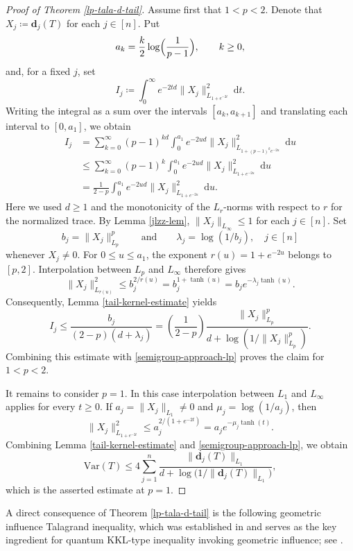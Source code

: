 \documentclass{amsbook}
\theoremstyle{definition}
\theoremstyle{remark}
\numberwithin{section}{chapter}
\numberwithin{equation}{chapter}
\newcommand{\1}{\mathbf{1}}
\newcommand{\dc}{\mathbf{d}}
\begin{document}
\begin{proof}[Proof of Theorem \ref{lp-tala-d-tail}]
 Assume first that $1<p<2$. Denote that $X_{j}\coloneqq \dc_{j}(T)$ for each $j\in [n]$. Put
\[
a_k=\frac{k}{2}\log\Bigl(\frac{1}{p-1}\Bigr),
\qquad k\geq0,
\]
and, for a fixed $j$, set
\[
I_{j}\coloneqq\int_0^\infty e^{-2td}\|X_j\|_{L_{1+e^{-2t}}}^2~\mathrm{d}t.
\]
Writing the integral as a sum over the intervals $[a_k,a_{k+1}]$ and
translating each interval to $[0,a_1]$, we obtain
\begin{align*}
I_{j}&=\sum_{k=0}^\infty (p-1)^{kd}\int_0^{a_1}e^{-2ud}\|X_j\|_{L_{1+(p-1)^ke^{-2u}}}^2~\mathrm{d}u \\
&\leq\sum_{k=0}^\infty (p-1)^k\int_0^{a_1}e^{-2ud}\|X_j\|_{L_{1+e^{-2u}}}^2~\mathrm{d}u \\
&=\frac{1}{2-p}\int_0^{a_1}e^{-2ud}\|X_j\|_{L_{1+e^{-2u}}}^2~\mathrm{d}u.
\end{align*}
Here we used $d\geq1$ and the monotonicity of the $L_{r}$-norms with respect to
$r$ for the normalized trace.
By Lemma \ref{jlzz-lem}, $\|X_j\|_{L_\infty}\leq1$ for each $j\in [n]$.  Set
\[
b_j=\|X_j\|_{L_p}^p
\qquad\text{and}\qquad
\lambda_j=\log(1/b_j),\quad j\in [n]
\]
whenever $X_j\neq0$.  For $0\leq u\leq a_1$, the exponent
$r(u)=1+e^{-2u}$ belongs to $[p,2]$.  Interpolation between $L_p$ and
$L_\infty$ therefore gives
\[
\|X_j\|_{L_{r(u)}}^2
 \leq b_j^{2/r(u)}
 =b_j^{1+\tanh(u)}
 =b_j e^{-\lambda_j\tanh(u)}.
\]
Consequently, Lemma \ref{tail-kernel-estimate} yields
\begin{equation}\label{tail-Ij-power}
I_{j}\leq \frac{b_j}{(2-p)(d+\lambda_j)}=\left(\frac{1}{2-p}\right)\frac{\|X_{j}\|_{L_p}^p}{d+\log\left(1/\|X_j\|_{L_p}^p\right)}.
\end{equation}
Combining this estimate with \eqref{semigroup-approach-lp} proves the claim
for $1<p<2$.

It remains to consider $p=1$.  In this case interpolation between $L_1$ and
$L_\infty$ applies for every $t\geq0$.  If
$a_j=\|X_j\|_{L_1}\neq0$ and $\mu_j=\log(1/a_j)$, then
\[
\|X_j\|_{L_{1+e^{-2t}}}^2
 \leq a_j^{2/(1+e^{-2t})}
 =a_j e^{-\mu_j\tanh(t)}.
\]
Combining Lemma \ref{tail-kernel-estimate} and \eqref{semigroup-approach-lp}, we obtain 
\[
\mathrm{Var}(T)
 \leq4\sum_{j=1}^n
 \frac{\|\dc_{j}(T)\|_{L_1}}
 {d+\log\bigl(1/\|\dc_{j}(T)\|_{L_1}\bigr)},
\]
which is the asserted estimate at $p=1$.
\end{proof}

A direct consequence of Theorem \ref{lp-tala-d-tail} is the following geometric influence Talagrand inequality, which was established in \cite[Theorem 3.2]{RWZ2024} and serves as the key ingredient for quantum KKL-type inequality invoking geometric influence; see \cite[Theorem 3.9]{RWZ2024}.
\end{document}
